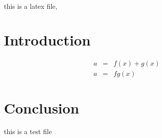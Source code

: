 this is a latex file, 


\section{Introduction}


\begin{align}
a & = & f(x)+g(x) \nonumber\\
a & = & fg(x)
\end{align}

\section{Conclusion}
this is a test file

\enddocument

